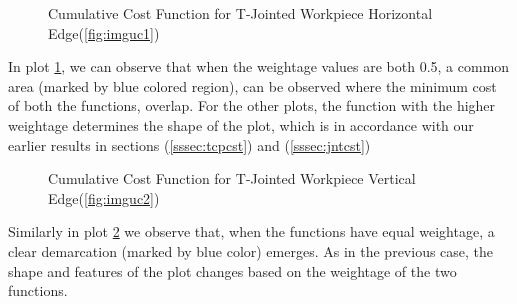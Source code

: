 \begin{figure}[!ht] %
	\centering
		\caption{Cumulative Cost Function for T-Jointed Workpiece Horizontal Edge(\ref{fig:imguc1})}
		\label{fig:tot1}
\end{figure}
In plot \ref{fig:tot1}, we can observe that when the weightage values are both 0.5, a common area (marked by blue colored region), can be observed where the minimum cost of both the functions, overlap. For the other plots, the function with the higher weightage determines the shape of the plot, which is in accordance with our earlier results in sections (\ref{sssec:tcpcst}) and (\ref{sssec:jntcst})

\begin{figure}[!ht] %
	\centering
	\caption{Cumulative Cost Function for T-Jointed Workpiece Vertical Edge(\ref{fig:imguc2})}
	\label{fig:tot2}
\end{figure}
Similarly in plot \ref{fig:tot2} we observe that, when the functions have equal weightage, a clear demarcation (marked by blue color) emerges. As in the previous case, the shape and features of the plot changes based on the weightage of the two functions. 

